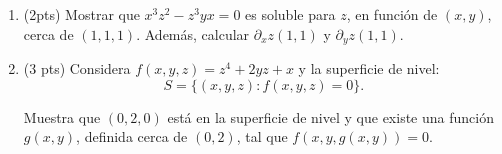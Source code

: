 \documentclass[12pt]{article}
\begin{document}
\bigskip

            
\bigskip
\bigskip
\bigskip






\begin{enumerate}

\item (2pts) Mostrar que $x^3z^2-z^3yx=0$ es soluble para $z$, en funci\'on
  de $(x,y)$, cerca de $(1,1,1)$. Adem\'as, calcular $\partial_xz(1,1)$
  y $\partial_yz(1,1)$.

\vspace{5cm}


\item (3 pts) Considera $f(x,y,z)=z^4+2yz+x$ y la superficie de nivel:
$$
S=\{(x,y,z): f(x,y,z)=0\}.
$$

Muestra que $(0,2,0)$ est\'a en la superficie de nivel y que existe
una funci\'on $g(x,y)$, definida cerca de $(0,2)$, tal que $f(x,y,g(x,y))=0$.


\end{enumerate}
 





  
\end{document}
